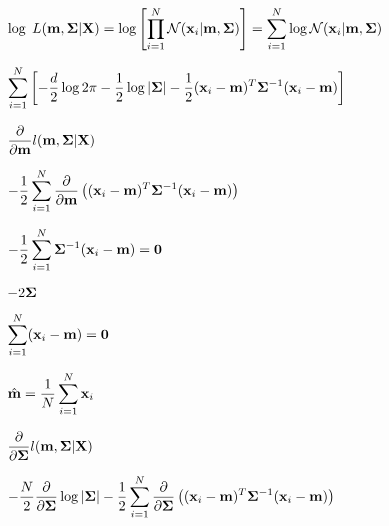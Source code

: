 \documentclass{article}
\def\lthtmlcheckvsize{\ifdim\ht\sizebox<\vsize 
  \ifdim\wd\sizebox<\hsize\expandafter\hfill\fi \expandafter\vfill
  \else\expandafter\vss\fi}%
\begin{document}
{\newpage\clearpage
{}%
$\displaystyle \log\; L({\bf m},{\bf\Sigma}|{\bf X})
=\log\left[\prod_{i=1}^N {\cal N}({\bf x}_i|{\bf m},{\bf\Sigma})\right]
=\sum_{i=1}^N \log {\cal N}({\bf x}_i|{\bf m},{\bf\Sigma})$%
\lthtmlindisplaymathZ
\lthtmlcheckvsize\clearpage}

{\newpage\clearpage
{}%
$\displaystyle \sum_{i=1}^N \left[-\frac{d}{2}\log 2\pi-\frac{1}{2}\log|{\bf\Sigma}|
-\frac{1}{2}({\bf x}_i-{\bf m})^T
{\bf\Sigma}^{-1}({\bf x}_i-{\bf m})\right]$%
\lthtmlindisplaymathZ
\lthtmlcheckvsize\clearpage}

{\newpage\clearpage
{}%
$\displaystyle \frac{\partial}{\partial{\bf m}} l({\bf m},{\bf\Sigma}|{\bf X})$%
\lthtmlindisplaymathZ
\lthtmlcheckvsize\clearpage}

{\newpage\clearpage
{}%
$\displaystyle -\frac{1}{2} \sum_{i=1}^N \frac{\partial}{\partial{\bf m}}
\left( ({\bf x}_i-{\bf m})^T {\bf\Sigma}^{-1}({\bf x}_i-{\bf m})\right)$%
\lthtmlindisplaymathZ
\lthtmlcheckvsize\clearpage}

{\newpage\clearpage
{}%
$\displaystyle -\frac{1}{2} \sum_{i=1}^N {\bf\Sigma}^{-1}({\bf x}_i-{\bf m})={\bf0}$%
\lthtmlindisplaymathZ
\lthtmlcheckvsize\clearpage}

{\newpage\clearpage
{}%
$ -2{\bf\Sigma}$%
\lthtmlindisplaymathZ
\lthtmlcheckvsize\clearpage}

{\newpage\clearpage
{}%
$\displaystyle \sum_{i=1}^N ({\bf x}_i-{\bf m})={\bf0}$%
\lthtmlindisplaymathZ
\lthtmlcheckvsize\clearpage}

{\newpage\clearpage
{}%
$\displaystyle \hat{\bf m}=\frac{1}{N} \sum_{i=1}^N {\bf x}_i$%
\lthtmlindisplaymathZ
\lthtmlcheckvsize\clearpage}

{\newpage\clearpage
{}%
$\displaystyle \frac{\partial}{\partial{\bf\Sigma}} l({\bf m},{\bf\Sigma}|{\bf X})$%
\lthtmlindisplaymathZ
\lthtmlcheckvsize\clearpage}

{\newpage\clearpage
{}%
$\displaystyle -\frac{N}{2}\frac{\partial}{\partial{\bf\Sigma}}\log|{\bf\Sigma}|
-\frac{1}{2} \sum_{i=1}^N \frac{\partial}{\partial{\bf\Sigma}}
\left( ({\bf x}_i-{\bf m})^T {\bf\Sigma}^{-1}({\bf x}_i-{\bf m})\right)$%
\lthtmlindisplaymathZ
\lthtmlcheckvsize\clearpage}
\end{document}
